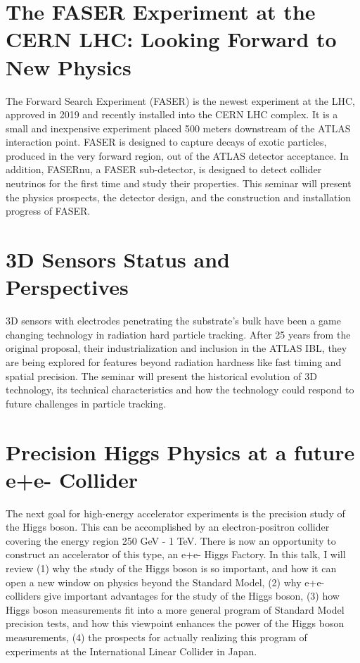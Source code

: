 \documentclass[12pt, a4paper, notitlepage, onecolumn]{article}
\begin{document}
\section{The FASER Experiment at the CERN LHC: Looking Forward to New Physics}
\noindent The Forward Search Experiment (FASER) is the newest experiment at the LHC, approved in 2019 and recently installed into the CERN LHC complex. It is a small and inexpensive experiment placed 500 meters downstream of the ATLAS interaction point. FASER is designed to capture decays of exotic particles, produced in the very forward region, out of the ATLAS detector acceptance. In addition, FASERnu, a FASER sub-detector, is designed to detect collider neutrinos for the first time and study their properties. This seminar will present the physics prospects, the detector design, and the construction and installation progress of FASER.

\section{3D Sensors Status and Perspectives}
\noindent 3D sensors with electrodes penetrating the substrate's bulk have been a game changing technology in radiation hard particle tracking. After 25 years from the original proposal, their industrialization and inclusion in the ATLAS IBL, they are being explored for features beyond radiation hardness like fast timing and spatial precision. The seminar will present the historical evolution of 3D technology, its technical characteristics and how the technology could respond to future challenges in particle tracking.

\section{Precision Higgs Physics at a future e+e- Collider}
\noindent The next goal for high-energy accelerator experiments is the precision study of the Higgs boson. This can be accomplished by an electron-positron collider covering the energy region 250 GeV - 1 TeV. There is now an opportunity to construct an accelerator of this type, an e+e- Higgs Factory. In this talk, I will review (1) why the study of the Higgs boson is so important, and how it can open a new window on physics beyond the Standard Model, (2) why e+e- colliders give important advantages for the study of the Higgs boson, (3) how Higgs boson measurements fit into a more general program of Standard Model precision tests, and how this viewpoint enhances the power of the Higgs boson measurements, (4) the prospects for actually realizing this program of experiments at the International Linear Collider in Japan.
\end{document}
